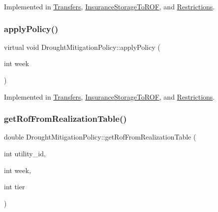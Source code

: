 Implemented in \mbox{\hyperlink{classTransfers_a3c1930dbeb1273c1c0be93ad5ca57357_a3c1930dbeb1273c1c0be93ad5ca57357}{Transfers}}, \mbox{\hyperlink{classInsuranceStorageToROF_ac7d317a7f189739275960e4f021108d8_ac7d317a7f189739275960e4f021108d8}{Insurance\+Storage\+To\+R\+OF}}, and \mbox{\hyperlink{classRestrictions_ab0a2b62495d6cdd8d1fedba419c05c37_ab0a2b62495d6cdd8d1fedba419c05c37}{Restrictions}}.

\mbox{\label{classDroughtMitigationPolicy_a76c1a85eaf7707306fe173b6437cc31d_a76c1a85eaf7707306fe173b6437cc31d}} 
\subsubsection{\texorpdfstring{apply\+Policy()}{applyPolicy()}}
{\footnotesize\ttfamily virtual void Drought\+Mitigation\+Policy\+::apply\+Policy (\begin{DoxyParamCaption}\item[{int}]{week }\end{DoxyParamCaption})\hspace{0.3cm}{\ttfamily [pure virtual]}}



Implemented in \mbox{\hyperlink{classTransfers_ad9e4e83ff763ac1ba518a19051cd2e69_ad9e4e83ff763ac1ba518a19051cd2e69}{Transfers}}, \mbox{\hyperlink{classInsuranceStorageToROF_a17aa84e0559793b3c463c468dfda3753_a17aa84e0559793b3c463c468dfda3753}{Insurance\+Storage\+To\+R\+OF}}, and \mbox{\hyperlink{classRestrictions_a1ef7559adc034bdddd047ee776b5f9a9_a1ef7559adc034bdddd047ee776b5f9a9}{Restrictions}}.

\mbox{\label{classDroughtMitigationPolicy_a685ce7eacb01cb262d7e5245a736aa38_a685ce7eacb01cb262d7e5245a736aa38}} 
\subsubsection{\texorpdfstring{get\+Rof\+From\+Realization\+Table()}{getRofFromRealizationTable()}}
{\footnotesize\ttfamily double Drought\+Mitigation\+Policy\+::get\+Rof\+From\+Realization\+Table (\begin{DoxyParamCaption}\item[{int}]{utility\+\_\+id,  }\item[{int}]{week,  }\item[{int}]{tier }\end{DoxyParamCaption})\hspace{0.3cm}{\ttfamily [protected]}}

